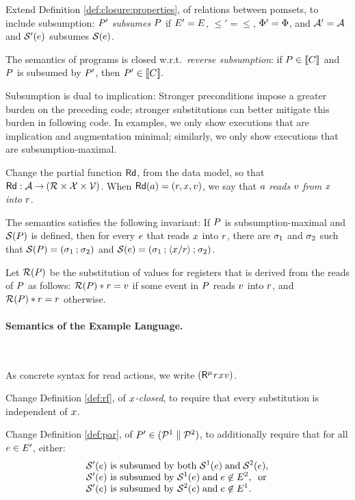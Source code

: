 Extend Definition \ref{def:closure:properties}, of relations between pomsets,
to include subsumption: $P'$ \emph{subsumes} $P$ if
$E'=E$, ${\le'}={\le}$, $\Phi'=\Phi$, and
$\mathcal{A}'=\mathcal{A}$ and $\mathcal{S}'(e)$ subsumes
$\mathcal{S}(e)$.

The semantics of programs is closed w.r.t.~\emph{reverse subsumption}: if
$P\in\llbracket C\rrbracket$ and $P$ is subsumed by $P'$, then
$P'\in\llbracket C\rrbracket$.

Subsumption is dual to implication: Strong\-er preconditions impose a greater
burden on the preceding code; stronger substitutions can better mitigate this
burden in following code.  In examples, we only show executions that are
implication and augmentation minimal; similarly, we only show executions that
are subsumption-maximal.

Change the partial function $\mathsf{Rd}$, from the data model, so that
$\mathsf{Rd}:\mathcal{A}\mathbin\rightarrow(\mathcal{R} \times \mathcal{X} \times \mathcal{V})$.  When
$\mathsf{Rd}(a) = (r,x,v)$, we say that $a$ \emph{reads}
$v$ \emph{from} $x$ \emph{into} $r$.

The semantics satisfies the following invariant: If $P$ is
subsumption\hyp{}maximal and $\mathcal{S}(P)$ is defined, then for every
$e$ that reads $x$ into $r$, there are $\sigma_1$ and
$\sigma_2$ such that
$\mathcal{S}(P) = (\sigma_1\mathbin{;}\sigma_2)$ and
$\mathcal{S}(e)= (\sigma_1\mathbin{;}\langle x/r\rangle\mathbin{;}\sigma_2)$.

Let $\mathcal{R}({P})$ be the substitution of values for registers that is
derived from the reads of $P$ as follows:
$\mathcal{R}({P})\mathbin{\ast}r=v$ if some event in $P$ reads $v$ into
$r$, and $\mathcal{R}({P})\mathbin{\ast}r=r$ otherwise.

\paragraph{Semantics of the Example Language.}\

As concrete syntax for read actions, we write
$(\DRreg[\amode]{\aReg}{\aLoc}{\aVal})$.

Change Definition \ref{def:rf}, of \emph{$x$-closed}, to require that
every substitution is independent of $x$.

Change Definition \ref{def:par}, of $P' \in (\mathcal{P}^1 \parallel \mathcal{P}^2)$,
to additionally require that for all $e\in E'$, either:
\begin{align*}
  &\mathcal{S}'(e) \text{ is subsumed by both } \mathcal{S}^1(e) \;\allowbreak\text{and}\allowbreak\; \mathcal{S}^2(e),\\[-1ex]
  &\mathcal{S}'(e) \text{ is subsumed by } \mathcal{S}^1(e) \;\allowbreak\text{and}\allowbreak\; e \not\in E^2,\; \; \allowbreak\text{or}\allowbreak\;\\[-1ex]
  &\mathcal{S}'(e) \text{ is subsumed by } \mathcal{S}^2(e) \;\allowbreak\text{and}\allowbreak\; e \not\in E^1.
\end{align*}

